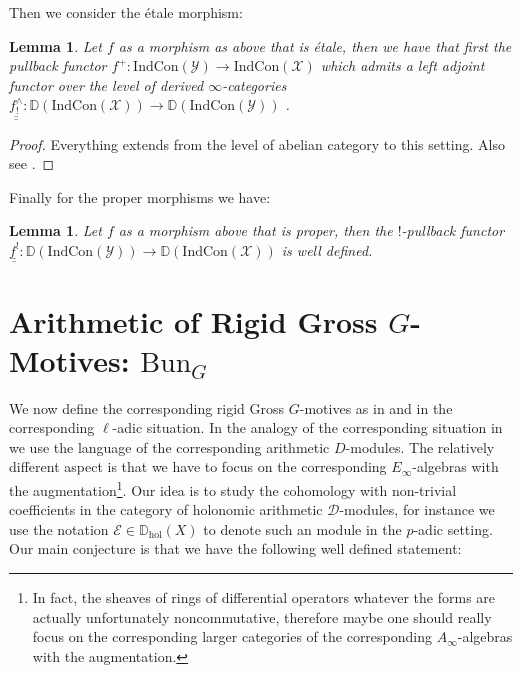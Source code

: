 \documentclass[11pt]{book}
\newtheorem{lemma}[theorem]{Lemma}
\theoremstyle{definition}
\numberwithin{equation}{section}
\begin{document}
\indent Then we consider the \'etale morphism:

\begin{lemma}
Let $f$ as a morphism as above that is \'etale, then we have that first the pullback functor $f^+:\mathrm{Ind}\mathrm{Con}(\mathcal{Y})\rightarrow \mathrm{Ind}\mathrm{Con}(\mathcal{X})$ which admits a left adjoint functor over the level of derived $\infty$-categories $\underline{\underline{f^\wedge_{!}}}: \mathbb{D}(\mathrm{Ind}\mathrm{Con}(\mathcal{X}))\rightarrow \mathbb{D}(\mathrm{Ind}\mathrm{Con}(\mathcal{Y}))$ .	
\end{lemma}


\begin{proof}
Everything extends from the level of abelian category to this setting. Also see \cite[1.2.2]{Abe1}.	
\end{proof}


\indent Finally for the proper morphisms we have:

\begin{lemma}
Let $f$ as a morphism above that is proper, then the $!$-pullback functor $\underline{\underline{f^!}}:\mathbb{D}(\mathrm{Ind}\mathrm{Con}(\mathcal{Y}))\rightarrow \mathbb{D}(\mathrm{Ind}\mathrm{Con}(\mathcal{X}))$ is well defined.	
\end{lemma}





\newpage
\section{Arithmetic of Rigid Gross $G$-Motives: $\mathrm{Bun}_G$}




\indent We now define the corresponding rigid Gross $G$-motives as in \cite{Gro1} and \cite{GL1} in the corresponding $\ell$-adic situation. In the analogy of the corresponding situation in \cite{GL1} we use the language of the corresponding arithmetic $D$-modules. The relatively different aspect is that we have to focus on the corresponding $E_\infty$-algebras with the augmentation\footnote{In fact, the sheaves of rings of differential operators whatever the forms are actually unfortunately noncommutative, therefore maybe one should really focus on the corresponding larger categories of the corresponding $A_\infty$-algebras with the augmentation.}. Our idea is to study the cohomology with non-trivial coefficients in the category of holonomic arithmetic $\mathcal{D}$-modules, for instance we use the notation $\mathcal{E}\in \mathbb{D}_{\mathrm{hol}}(X)$ to denote such an module in the $p$-adic setting. Our main conjecture is that we have the following well defined statement:
\end{document}
